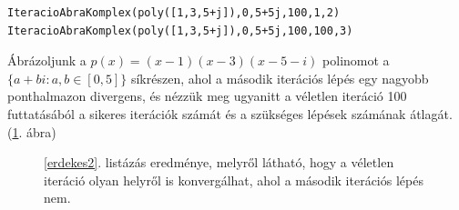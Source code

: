 \documentclass[a4paper,12pt]{report}
\begin{document}
                \begin{singlespace}
                \begin{lstlisting}[caption=Bemenet,label=erdekes2]
IteracioAbraKomplex(poly([1,3,5+j]),0,5+5j,100,1,2)
IteracioAbraKomplex(poly([1,3,5+j]),0,5+5j,100,100,3)
				\end{lstlisting}
                \end{singlespace}
                Ábrázoljunk a $p(x)=(x-1)(x-3)(x-5-i)$ polinomot a $\{a+bi : a,b\in [0,5]\}$ síkrészen, ahol a második iterációs lépés egy nagyobb ponthalmazon divergens, és nézzük meg ugyanitt a véletlen iteráció 100 futtatásából a sikeres iterációk számát és a szükséges lépések számának átlagát. (\ref{atcsuszokep}. ábra)
                			\begin{figure}[h]
					\centering
			        \caption{\ref{erdekes2}. listázás eredménye, melyről látható, hogy a véletlen iteráció olyan helyről is konvergálhat, ahol a második iterációs lépés nem.}\label{atcsuszokep}
				\end{figure}
                
				










\end{document}
